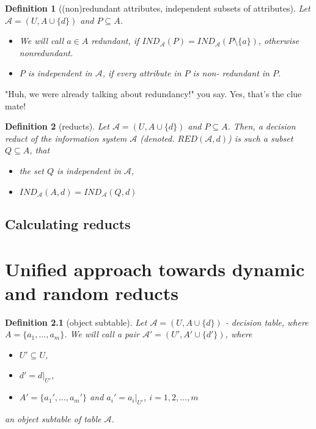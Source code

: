 \documentclass[12pt]{pracamgr}
\newtheorem{definition}{Definition}[chapter]
\begin{document}
\begin{definition}[(non)redundant attributes, independent subsets of attributes]

  Let $\mathcal{A} = (U, A \cup \{d\})$  and $P \subseteq A$.
  \begin{itemize}
    \item We will call $a \in A$ \emph{redundant}, if 
    $IND_\mathcal{A}(P) = IND_\mathcal{A}(P \setminus\{a\})$, otherwise \emph{nonredundant}.
    \item $P$ is \emph{independent} in $\mathcal{A}$, if every attribute in $P$ is non-
    redundant in $P$.
  \end{itemize}

\end{definition}

"Huh, we were already talking about redundancy!" you say. Yes, that's the clue mate!

\begin{definition}[reducts]

  Let $\mathcal{A} = (U, A \cup \{d\})$  and $P \subseteq A$. Then, a \emph{decision reduct
  of the information system $\mathcal{A}$} (denoted. $RED(\mathcal{A}, d)$) is such a
  subset $Q \subseteq A$, that
  \begin{itemize}
    \item the set $Q$ is independent in $\mathcal{A}$,
    \item $IND_\mathcal{A}(A, d) = IND_\mathcal{A}(Q, d)$
  \end{itemize}

\end{definition}


\section{Calculating reducts}


\chapter{Unified approach towards dynamic and random reducts}
\label{chap:dynamicrandomreducts}

\begin{definition}[object subtable]

  Let $\mathcal{A} = (U, A \cup \{d\})$ - decision table, where $A = \{a_1, \dots, a_m\}$. 
  We will call a pair $\mathcal{A'}  = (U', A' \cup \{d'\})$, where 
  \begin{itemize}
    \item $U' \subseteq U$,
    \item $d' = d |_{U'}$,
    \item $A' = \{a_1', \dots,  a_m'\}$ and $a_i' = a_i |_{U'}$, $i = 1, 2, \dots, m$
  \end{itemize}
  an \emph{object subtable} of table $\mathcal{A}$.
  
\end{definition}
\end{document}
